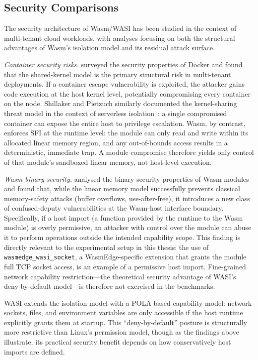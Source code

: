 \subsection{Security Comparisons}
\label{sec:security_comparisons}

The security architecture of \acs{Wasm}/\acs{WASI} has been studied in the context of multi-tenant cloud workloads, with analyses focusing on both the structural advantages of \acs{Wasm}'s isolation model and its residual attack surface.

\textit{Container security risks.}\quad \textcite{combe2016docker} surveyed the security properties of Docker and found that the shared-kernel model is the primary structural risk in multi-tenant deployments. If a container escape vulnerability is exploited, the attacker gains code execution at the host kernel level, potentially compromising every container on the node. Shillaker and Pietzuch similarly documented the kernel-sharing threat model in the context of serverless isolation~\cite{shillaker2020faasm}: a single compromised container can expose the entire host to privilege escalation. \acs{Wasm}, by contrast, enforces \acs{SFI} at the runtime level: the module can only read and write within its allocated linear memory region, and any out-of-bounds access results in a deterministic, immediate trap. A module compromise therefore yields only control of that module's sandboxed linear memory, not host-level execution.

\textit{Wasm binary security.}\quad \textcite{lehmann2020everythingold} analysed the binary security properties of \acs{Wasm} modules and found that, while the linear memory model successfully prevents classical memory-safety attacks (buffer overflows, use-after-free), it introduces a new class of confused-deputy vulnerabilities at the Wasm-host interface boundary. Specifically, if a host import (a function provided by the runtime to the \acs{Wasm} module) is overly permissive, an attacker with control over the module can abuse it to perform operations outside the intended capability scope. This finding is directly relevant to the experimental setup in this thesis: the use of \texttt{wasmedge\_wasi\_socket}, a \acs{WasmEdge}-specific extension that grants the module full \acs{TCP} socket access, is an example of a permissive host import. Fine-grained network capability restriction---the theoretical security advantage of \acs{WASI}'s deny-by-default model---is therefore not exercised in the benchmarks.

\acs{WASI} extends the isolation model with a \ac{POLA}-based capability model: network sockets, files, and environment variables are only accessible if the host runtime explicitly grants them at startup. This ``deny-by-default'' posture is structurally more restrictive than Linux's permission model, though as the findings above illustrate, its practical security benefit depends on how conservatively host imports are defined.

